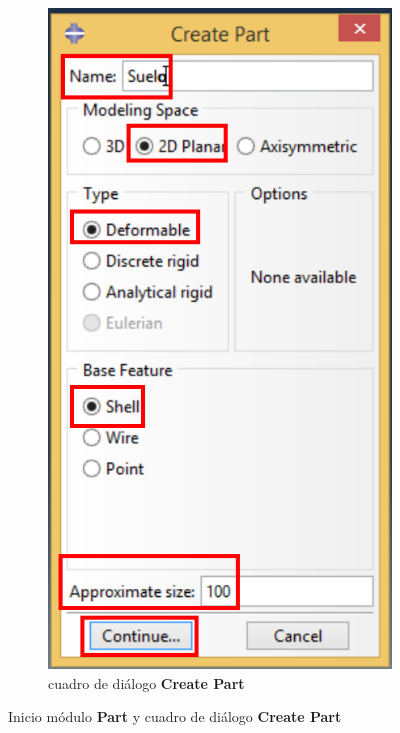 \begin{figure}
\begin{subfigure}[!h]{0.39\textwidth}
      \includegraphics[width=\textwidth]{./body/images/part02.pdf}
      \caption{cuadro de diálogo \textbf{Create Part}}
      \label{part02}
    \end{subfigure}%
    \caption{Inicio módulo \textbf{Part} y cuadro de diálogo
      \textbf{Create Part}}
  \end{figure}
